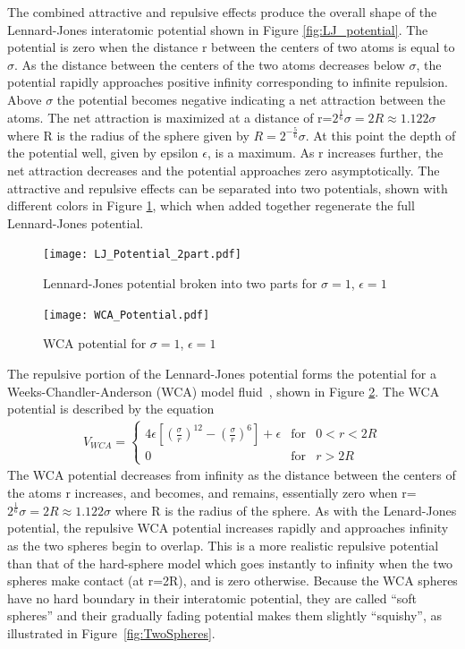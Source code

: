 \documentclass[double,12pt]{beavtex}
\begin{document}
The combined attractive and repulsive effects produce the overall shape of 
the Lennard-Jones interatomic potential shown in Figure \ref{fig:LJ_potential}. 
The potential is zero when the distance r between the centers of two atoms 
is equal to $\sigma$. 
As the distance 
between the centers of the two atoms decreases below $\sigma$, the potential 
rapidly approaches positive infinity corresponding to infinite repulsion. 
Above $\sigma$ the potential becomes negative indicating a net attraction 
between the atoms. The net attraction is maximized at a distance of 
r=$2^\frac{1}{6}\sigma=2R\approx{1.122}\sigma$ where R is the radius of 
the sphere given by $R={2^{-\frac{5}{6}}}\sigma$. At this point the depth of
the potential well, given by epsilon $\epsilon$, is a maximum. As r increases 
further, the net attraction decreases and the potential approaches zero
asymptotically. The attractive and repulsive effects can be separated into two
potentials, shown with different colors in Figure \ref{fig:LJ_potential_2parts}, 
which when added together regenerate the full Lennard-Jones potential. 

\begin{figure}
    \centering
    \texttt{[image: LJ\_Potential\_2part.pdf]}
    \caption{Lennard-Jones potential broken into two parts for $\sigma=1$, $\epsilon=1$}
    \label{fig:LJ_potential_2parts}
  \end{figure}

\begin{figure}
    \centering
    \texttt{[image: WCA\_Potential.pdf]}
    \caption{WCA potential for $\sigma=1$, $\epsilon=1$}
    \label{fig:WCA_potential}
  \end{figure}

The repulsive portion of the Lennard-Jones potential forms the potential for a 
Weeks-Chandler-Anderson (WCA) model fluid~\cite{andersen1971relationship},
shown in Figure \ref{fig:WCA_potential}. 
The WCA potential is described by the equation 
\begin{align} \label{eq:VWCA}
    V_{WCA}=\left\{\begin{array}{rcl} {4\epsilon{\left[\left(\frac{\sigma}{r}\right)^{12} - \left(\frac{\sigma}{r}\right)^6 \right]}+\epsilon} & \mbox{for} & 0<r<{2R} \\ 0 & \mbox{for} & r>2R \end{array}\right.
\end{align} 
The WCA potential decreases from infinity as the distance between the 
centers of the atoms r increases, and becomes, and remains, essentially 
zero when r=$2^\frac{1}{6}\sigma=2R\approx{1.122}\sigma$ where R is the 
radius of the sphere. 
As with the Lenard-Jones potential, the repulsive WCA potential increases 
rapidly and approaches infinity as the two spheres begin to overlap. This 
is a more realistic repulsive potential than that of the hard-sphere model 
which goes instantly to infinity when the two spheres make contact (at r=2R), 
and is zero otherwise. Because the WCA spheres have no hard boundary in 
their interatomic potential, they are called ``soft spheres'' and their 
gradually fading potential makes them slightly ``squishy'', as illustrated in
Figure~\ref{fig:TwoSpheres}.
\end{document}
